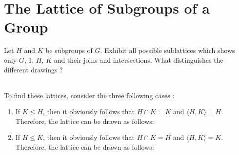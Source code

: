 \section{The Lattice of Subgroups of a Group}

\begin{exercise}
    Let $H$ and $K$ be subgroups of $G$. Exhibit all possible sublattices which shows only $G$, 1, $H$, $K$ and their joins and intersections. What distinguishes the different drawings ? \\
\end{exercise}

\begin{solution}
    \\ To find these lattices, consider the three following cases : 
    \begin{enumerate}
        \item If $K \leq H$, then it obviously follows that $H \cap K = K$ and $\langle H,K \rangle = H$. Therefore, the lattice can be drawn as follows:
        
        \begin{center}
        \end{center}

        \item If $H \leq K$, then it obviously follows that $H \cap K = H$ and $\langle H,K \rangle = K$. Therefore, the lattice can be drawn as follows:
        
        \begin{center}
        \end{center}


\end{enumerate}
\end{solution}
